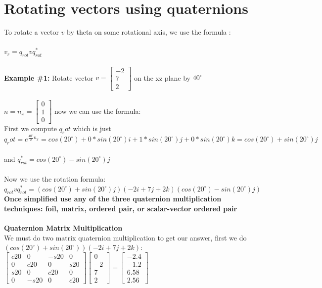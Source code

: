 \documentclass{article}
\begin{document}
\section{Rotating vectors using quaternions}
To rotate a vector $v$ by theta on some rotational axis, we use the formula :\\\\
$v_r  = q_{rot}vq_{rot}^*$\\\\
\textbf{Example \#1: } Rotate vector $v=\begin{bmatrix}
-2\\
7\\
2
\end{bmatrix}$ on the xz plane by $40^\circ$\\\\
$n = n_x = \begin{bmatrix}
0\\
1\\
0
\end{bmatrix}$ now we can use the formula:\\
First we compute $q_rot$ which is just $q_rot=e^{\frac{40^\circ}{2} n_x }=cos(20^\circ) + 0*sin(20^\circ)i + 1*sin(20^\circ)j + 0*sin(20^\circ)k=cos(20^\circ)+sin(20^\circ)j$\\\\
and  $q_{rot}^*=cos(20^\circ)-sin(20^\circ)j$\\\\
Now we use the rotation formula:\\
$q_{rot}vq_{rot}^*=(cos(20^\circ)+sin(20^\circ)j) (-2i+7j+2k) (cos(20^\circ)-sin(20^\circ)j)$\\
\textbf{Once simplified use any of the three quaternion multiplication techniques: foil, matrix, ordered pair, or scalar-vector ordered pair }\\\\
\textbf{Quaternion Matrix Multiplication}\\
We must do two matrix quaternion multiplication to get our answer, first we do $(cos(20^\circ)+sin(20^\circ)) (-2i+7j+2k)$:\\
$\begin{bmatrix}
c20 & 0 & -s20 & 0\\
0 & c20 & 0 & s20\\
s20 & 0 & c20 & 0\\
0 & -s20 & 0 & c20
\end{bmatrix}\begin{bmatrix}
0\\
-2\\
7\\
2
\end{bmatrix}=\begin{bmatrix}
-2.4\\
-1.2\\
6.58\\
2.56
\end{bmatrix}$\\\\
\end{document}
